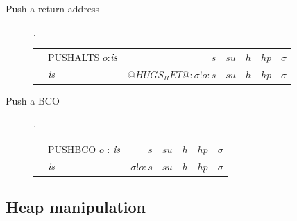 \documentclass[11pt]{article}
\newcommand{\Subsection}[2]{\subsection{#1}\label{sec:#2}}
\begin{document}
\begin{description}
\item[ Push a return address ].

\begin{tabular}{|llrrrrr|}
\hline
	& PUSHALTS $o$:$\mbox{\it is}$	& $s$ 			& $su$ & $h$ & $hp$ & $\sigma$ \\
\next	& $\mbox{\it is}$			& $@HUGS_RET@:\sigma!o:s$ 	& $su$ & $h$ & $hp$ & $\sigma$ \\
\hline
\end{tabular}

\item[ Push a BCO ].

\begin{tabular}{|llrrrrr|}
\hline
	& PUSHBCO $o$ : $\mbox{\it is}$	& $s$ 			& $su$ & $h$ & $hp$ & $\sigma$ \\
\next	& $\mbox{\it is}$			& $\sigma!o : s$ 	& $su$ & $h$ & $hp$ & $\sigma$ \\
\hline
\end{tabular}

\end{description}

\Subsection{Heap manipulation}{hugs-heap-manipulation}
\end{document}

